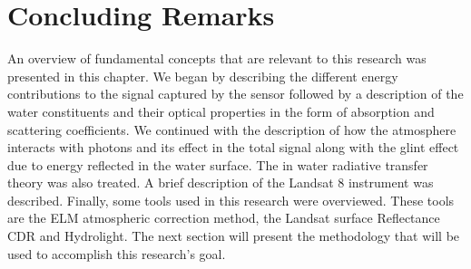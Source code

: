 
\section{Concluding Remarks}
An overview of fundamental concepts that are relevant to this research was presented in this chapter. We began by describing the different energy contributions to the signal captured by the sensor followed by a description of the water constituents and their optical properties in the form of absorption and scattering coefficients. We continued with the description of how the atmosphere interacts with photons and its effect in the total signal along with the glint effect due to energy reflected in the water surface. The in water radiative transfer theory was also treated. A brief description of the Landsat 8 instrument was described. Finally, some tools used in this research were overviewed. These tools are the ELM atmospheric correction method, the Landsat surface Reflectance CDR and Hydrolight. The next section will present the methodology that will be used to accomplish this research's goal.
